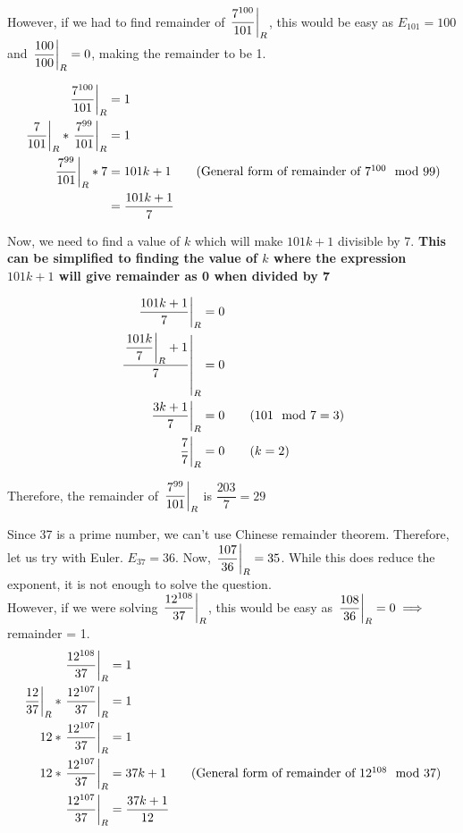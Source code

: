 However, if we had to find remainder of $\displaystyle{ \left. \frac{7^{100}}{101} \right |_{R} }$, this would be easy as $E_{101} = 100$ and $\displaystyle{ \left. \frac{100}{100} \right |_{R} } = 0$, making the remainder to be 1. 

\begin{align*}
    \remFrac{7^{100}}{101} &= 1 \\
    \remFrac{7}{101} * \remFrac{7^{99}}{101} &= 1 \\
    \remFrac{7^{99}}{101} * 7 &= 101k + 1 \tag{General form of remainder of $7^{100} \mod 99$} \\
    &= \dfrac{101k + 1}{7}
\end{align*}

Now, we need to find a value of $k$ which will make $101k + 1$ divisible by 7. \textbf{This can be simplified to finding the value of $k$ where the expression $101k + 1$ will give remainder as 0 when divided by 7}

\begin{align*}
    \displaystyle{ \left. \frac{101k + 1}{7} \right |_{R} } &= 0 \\
    \displaystyle{ \left. \frac{\displaystyle{ \left. \frac{101k}{7} \right |_{R} } + 1}{7} \right |_{R} } &= 0 \\
    \displaystyle{ \left. \frac{3k + 1}{7} \right |_{R} } &= 0 \tag{$101 \mod 7 = 3$} \\
    \displaystyle{ \left. \frac{7}{7} \right |_{R} } &= 0 \tag{$k=2$} \\
\end{align*}

Therefore, the remainder of $\displaystyle{ \left. \frac{7^{99}}{101} \right |_{R} }$ is $\dfrac{203}{7} = 29$


Since 37 is a prime number, we can't use Chinese remainder theorem. Therefore, let us try with Euler. $E_{37} = 36$. Now, $\displaystyle{ \left. \frac{107}{36} \right |_{R} } = 35$. While this does reduce the exponent, it is not enough to solve the question. \\

However, if we were solving $\displaystyle{ \left. \frac{12^{108}}{37} \right |_{R} }$, this would be easy as $\displaystyle{ \left. \frac{108}{36} \right |_{R} } = 0 \implies$ remainder = 1. \\

\begin{align*}
    \remFrac{12^{108}}{37} &= 1 \\
    \remFrac{12}{37} * \remFrac{12^{107}}{37} &= 1 \\
    12 * \remFrac{12^{107}}{37} &= 1 \\
    12 * \remFrac{12^{107}}{37} &= 37k + 1 \tag{General form of remainder of $12^{108} \mod 37$} \\
    \remFrac{12^{107}}{37} &= \dfrac{37k + 1}{12}
\end{align*}

